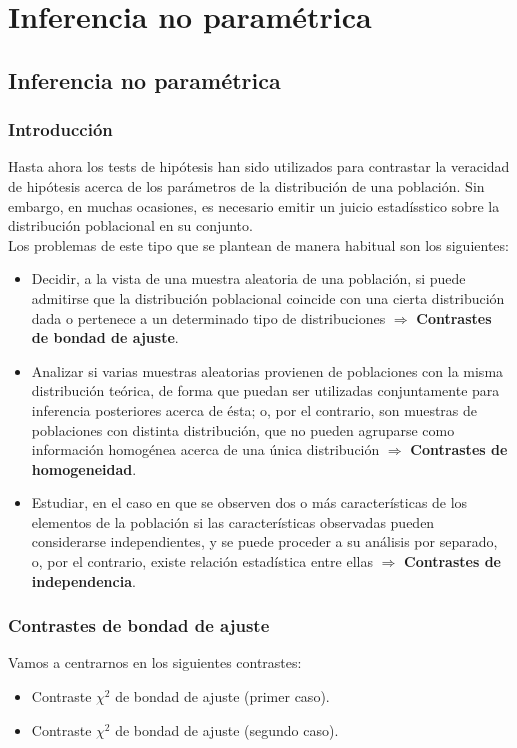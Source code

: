 \part{Inferencia no paramétrica}

\chapter{Inferencia no paramétrica}

\section{Introducción}

\noindent Hasta ahora los tests de hipótesis han sido utilizados para contrastar la veracidad de hipótesis acerca de los parámetros de la distribución de una población. Sin embargo,
en muchas ocasiones, es necesario emitir un juicio estadísstico sobre la distribución poblacional en su conjunto.
\\
\newline
Los problemas de este tipo que se plantean de manera habitual son los siguientes:
\begin{itemize}
    \item Decidir, a la vista de una muestra aleatoria de una población, si puede admitirse que la distribución poblacional coincide con una cierta distribución dada o pertenece a un determinado tipo de distribuciones $\Rightarrow$ \textbf{Contrastes de bondad de ajuste}.
    \item Analizar si varias muestras aleatorias provienen de poblaciones con la misma distribución teórica, de forma que puedan ser utilizadas conjuntamente para inferencia posteriores acerca de ésta; o, por el contrario, son muestras de poblaciones con distinta distribución, que no pueden agruparse como información homogénea acerca de una única distribución $\Rightarrow$ \textbf{Contrastes de homogeneidad}.
    \item Estudiar, en el caso en que se observen dos o más características de los elementos de la población si las características observadas pueden considerarse independientes, y se puede proceder a su análisis por separado, o, por el contrario, existe relación estadística entre ellas $\Rightarrow$ \textbf{Contrastes de independencia}.
\end{itemize}

\section{Contrastes de bondad de ajuste}
\noindent Vamos a centrarnos en los siguientes contrastes:
\begin{itemize}
    \item Contraste $\chi^2$ de bondad de ajuste (primer caso).
    \item Contraste $\chi^2$ de bondad de ajuste (segundo caso).
\end{itemize}

